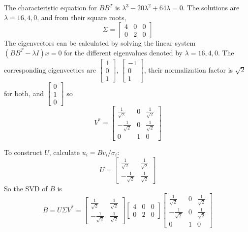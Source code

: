 \documentclass{article}
\begin{document}
The characteristic equation for $\displaystyle BB^T$ is $\displaystyle \lambda^{3} - 20 \lambda^{2} + 64 \lambda = 0$.
The solutions are $\displaystyle \lambda = 16, 4, 0$, and from their square roots,
\[\Sigma  = \left[ {\begin{array}{*{20}{c}}
                    4 & 0 & 0 \\
                    0 & 2 & 0
                \end{array}} \right]\]
The eigenvectors can be calculated by solving the linear system $(BB^T - \lambda I) x = 0$ for the different eigenvalues denoted by $\lambda = 16, 4, 0$.
The corresponding eigenvectors are
$\displaystyle \left[\begin{matrix}1\\0\\1\end{matrix}\right]$,
$\displaystyle \left[\begin{matrix}-1\\0\\1\end{matrix}\right]$,
their normalization factor is $\displaystyle \sqrt{2}$ for both, and
$\displaystyle \left[\begin{matrix}0\\1\\0\end{matrix}\right]$ so
\[{V^ * } = \left[ {\begin{array}{*{20}{c}}
                    {\frac{1}{{\sqrt 2 }}}    & 0 & {\frac{1}{{\sqrt 2 }}} \\
                    { - \frac{1}{{\sqrt 2 }}} & 0 & {\frac{1}{{\sqrt 2 }}} \\
                    0                         & 1 & 0
                \end{array}} \right]\]

To construct $U$, calculate ${u_i} = B{v_i}/{\sigma _i}$:
\[U  = \left[ {\begin{array}{*{20}{c}}
                    {\frac{1}{{\sqrt 2 }}}    & {\frac{1}{{\sqrt 2 }}} \\
                    { - \frac{1}{{\sqrt 2 }}} & {\frac{1}{{\sqrt 2 }}}
                \end{array}} \right]\]
So the SVD of $B$ is
\[B = U\Sigma {V^ * } = \left[ {\begin{array}{*{20}{c}}
                    {\frac{1}{{\sqrt 2 }}}    & {\frac{1}{{\sqrt 2 }}} \\
                    { - \frac{1}{{\sqrt 2 }}} & {\frac{1}{{\sqrt 2 }}}
                \end{array}} \right]\left[ {\begin{array}{*{20}{c}}
                    4 & 0 & 0 \\
                    0 & 2 & 0
                \end{array}} \right]\left[ {\begin{array}{*{20}{c}}
                    {\frac{1}{{\sqrt 2 }}}    & 0 & {\frac{1}{{\sqrt 2 }}} \\
                    { - \frac{1}{{\sqrt 2 }}} & 0 & {\frac{1}{{\sqrt 2 }}} \\
                    0                         & 1 & 0
                \end{array}} \right]\]
\end{document}
